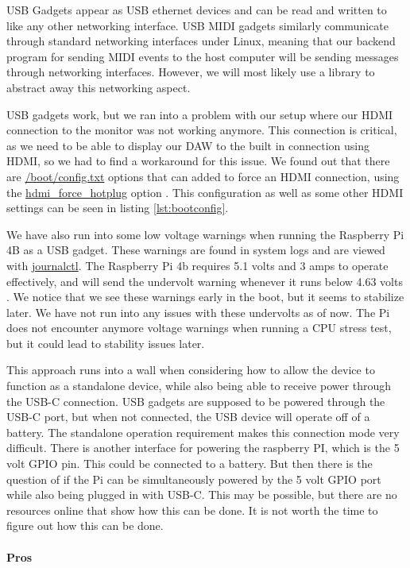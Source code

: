 USB Gadgets appear as USB ethernet devices and can be read and written to like any other
networking interface. USB MIDI gadgets similarly communicate through standard networking
interfaces under Linux, meaning that our backend program for sending MIDI events to the
host computer will be sending messages through networking interfaces. However, we will
most likely use a library to abstract away this networking aspect.

USB gadgets work, but we ran into a problem with our setup where our HDMI connection to
the monitor was not working anymore. This connection is critical, as we need to be able to
display our DAW to the built in connection using HDMI, so we had to find a workaround for
this issue. We found out that there are \url{/boot/config.txt} options that can added to
force an HDMI connection, using the \url{hdmi_force_hotplug} option
\autocite{raspberryPiHDMIFix}. This configuration as well as some other HDMI settings can
be seen in listing \ref{lst:bootconfig}.

We have also run into some low voltage warnings when running the Raspberry Pi 4B as a USB
gadget. These warnings are found in system logs and are viewed with \url{journalctl}. The
Raspberry Pi 4b requires 5.1 volts and 3 amps to operate effectively, and will send the
undervolt warning whenever it runs below 4.63 volts \autocite{raspberryPiAmps}. We notice
that we see these warnings early in the boot, but it seems to stabilize later. We have not
run into any issues with these undervolts as of now. The Pi does not encounter anymore
voltage warnings when running a CPU stress test, but it could lead to stability issues
later.

This approach runs into a wall when considering how to allow the device to function as a
standalone device, while also being able to receive power through the USB-C connection.
USB gadgets are supposed to be powered through the USB-C port, but when not connected, the
USB device will operate off of a battery. The standalone operation requirement makes this
connection mode very difficult. There is another interface for powering the raspberry PI,
which is the 5 volt GPIO pin. This could be connected to a battery. But then there is the
question of if the Pi can be simultaneously powered by the 5 volt GPIO port while also
being plugged in with USB-C. This may be possible, but there are no resources online that
show how this can be done. It is not worth the time to figure out how this can be done.

\paragraph{Pros}

